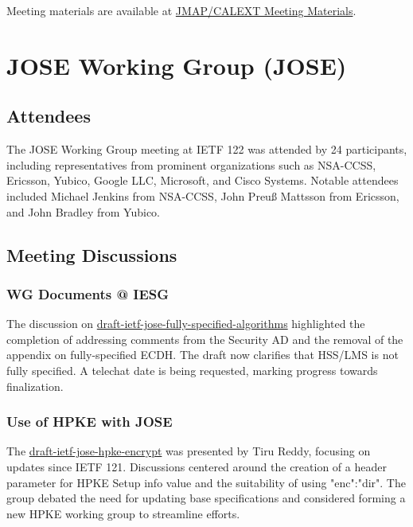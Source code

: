 \documentclass{article}
\begin{document}
Meeting materials are available at \href{https://datatracker.ietf.org/meeting/122/session/jmap}{JMAP/CALEXT Meeting Materials}.




\newpage

\section{JOSE Working Group (JOSE)} 

\subsection{Attendees}

The JOSE Working Group meeting at IETF 122 was attended by 24 participants, including representatives from prominent organizations such as NSA-CCSS, Ericsson, Yubico, Google LLC, Microsoft, and Cisco Systems. Notable attendees included Michael Jenkins from NSA-CCSS, John Preuß Mattsson from Ericsson, and John Bradley from Yubico.

\subsection{Meeting Discussions}

\subsubsection{WG Documents @ IESG}

The discussion on \href{https://datatracker.ietf.org/doc/html/draft-ietf-jose-fully-specified-algorithms}{draft-ietf-jose-fully-specified-algorithms} highlighted the completion of addressing comments from the Security AD and the removal of the appendix on fully-specified ECDH. The draft now clarifies that HSS/LMS is not fully specified. A telechat date is being requested, marking progress towards finalization.

\subsubsection{Use of HPKE with JOSE}

The \href{https://datatracker.ietf.org/doc/html/draft-ietf-jose-hpke-encrypt}{draft-ietf-jose-hpke-encrypt} was presented by Tiru Reddy, focusing on updates since IETF 121. Discussions centered around the creation of a header parameter for HPKE Setup info value and the suitability of using "enc":"dir". The group debated the need for updating base specifications and considered forming a new HPKE working group to streamline efforts.
\end{document}
